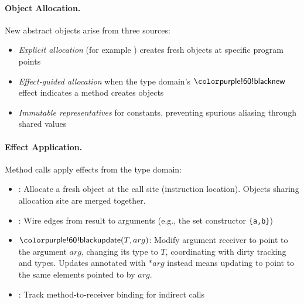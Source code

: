\paragraph{Object Allocation.}
New abstract objects arise from three sources:
\begin{itemize}
\item \emph{Explicit allocation} (for example \tBind) creates fresh objects at specific program points
\item \emph{Effect-guided allocation} when the type domain's $\tnew$ effect indicates a method creates objects  
\item \emph{Immutable representatives} for constants, preventing spurious aliasing through shared values
\end{itemize}

\paragraph{Effect Application.}
Method calls apply effects from the type domain:
\begin{itemize}
\item \tnew: Allocate a fresh object at the call site (instruction location). Objects sharing allocation site are merged together.
\item \tptstoargs: Wire edges from result to arguments (e.g., the set constructor \texttt{\{a,b\}})
\item $\tupdate(T, arg)$: Modify argument receiver to point to the argument $arg$, changing its type to $T$, coordinating with dirty tracking and types. Updates annotated with $*arg$ instead means updating to point to the same elements pointed to by $arg$. 
\item \tboundmeth: Track method-to-receiver binding for indirect calls
\end{itemize}

